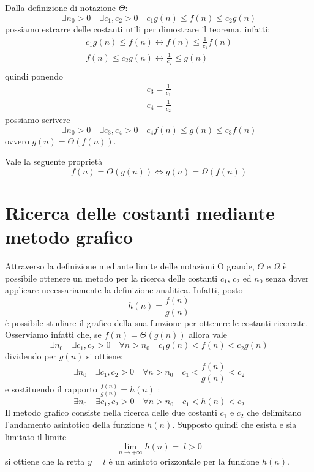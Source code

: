 	Dalla definizione di notazione $\Theta$:
	\begin{equation}
		\exists n_{0}>0 \quad \exists c_{1},c_{2} > 0 \quad c_{1}g(n) \leq f(n) \leq c_{2}g(n)
	\end{equation}
	possiamo estrarre delle costanti utili per dimostrare il teorema, infatti:
	\begin{eqnarray}
		c_{1}g(n) \leq f(n) \leftrightarrow f(n) \leq \frac{1}{c_{1}} f(n) \nonumber \\
		f(n) \leq c_{2}g(n) \leftrightarrow \frac{1}{c_{2}} \leq g(n) \nonumber \\
	\end{eqnarray}
	quindi ponendo
	\begin{eqnarray}
		c_{3}=\frac{1}{c_{1}} \nonumber \\
		c_{4}=\frac{1}{c_{2}} \nonumber
	\end{eqnarray}
	possiamo scrivere
	\begin{equation}
		\exists n_{0}>0 \quad \exists c_{3},c_{4} > 0 \quad c_{4}f(n) \leq g(n) \leq c_{3}f(n)
	\end{equation}
	ovvero $g(n)=\Theta(f(n))$.
\begin{flushright}
	\blacksquare
\end{flushright}

\begin{teorbox}
		Vale la seguente proprietà
	\begin{equation}
		f(n)=O(g(n)) \Leftrightarrow g(n)=\Omega(f(n))
	\end{equation}
\end{teorbox}

\section{Ricerca delle costanti mediante metodo grafico}
Attraverso la definizione mediante limite delle notazioni O grande, $\Theta$ e $\Omega$ è possibile ottenere un metodo per la ricerca delle costanti $c_{1}$, $c_{2}$ ed $n_{0}$ senza dover applicare necessariamente la definizione analitica. Infatti, posto $$h(n)=\frac{f(n)}{g(n)}$$ è possibile studiare il grafico della sua funzione per ottenere le costanti ricercate.
Osserviamo infatti che, se $f(n)=\Theta(g(n))$ allora vale
\[
\exists n_{0} \quad \exists c_{1},c_{2}>0 \quad \forall n>n_{0} \quad c_{1}g(n)<f(n)<c_{2}g(n)
\]
dividendo per $g(n)$ si ottiene:
\[
\exists n_{0} \quad \exists c_{1},c_{2}>0 \quad \forall n>n_{0} \quad c_{1}<\frac{f(n)}{g(n)}<c_{2}
\]
e sostituendo il rapporto $\frac{f(n)}{g(n)}=h(n)$ :
\[
\exists n_{0} \quad \exists c_{1},c_{2}>0 \quad \forall n>n_{0} \quad c_{1}<h(n)<c_{2}
\]
Il metodo grafico consiste nella ricerca delle due costanti $c_{1}$ e $c_{2}$ che delimitano l'andamento asintotico della funzione $h(n)$. Supposto quindi che esista e sia limitato il limite
\[
\lim_{n \to +\infty} h(n)= \; l >0
\]
si ottiene che la retta $y=l$ è un asintoto orizzontale per la funzione $h(n)$.

